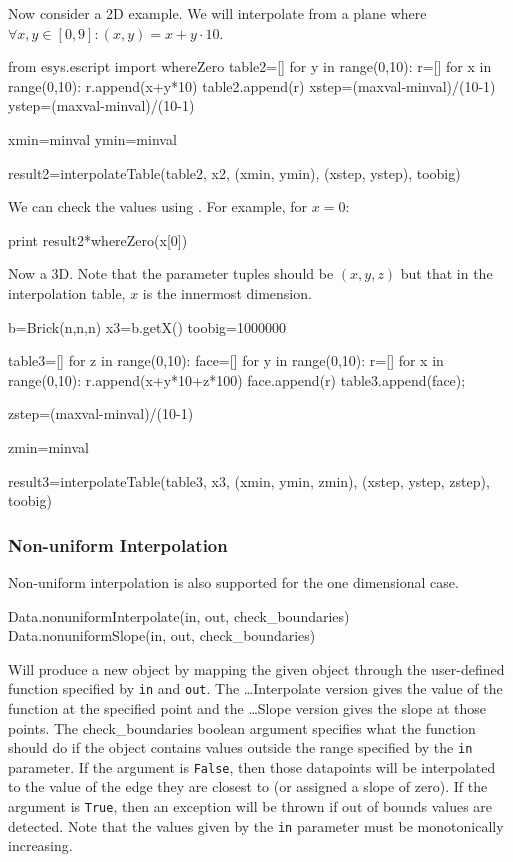 Now consider a 2D example. We will interpolate from a plane where $\forall x,y\in[0,9]:(x,y)=x+y\cdot10$.

\begin{python}
from esys.escript import whereZero
table2=[]
for y in range(0,10):
      r=[]
      for x in range(0,10):
	 r.append(x+y*10)
      table2.append(r)
xstep=(maxval-minval)/(10-1)
ystep=(maxval-minval)/(10-1)

xmin=minval
ymin=minval

result2=interpolateTable(table2, x2, (xmin, ymin), (xstep, ystep), toobig)
\end{python}

We can check the values using .
For example, for $x=0$:
\begin{python}
print result2*whereZero(x[0]) 
\end{python}

Now a 3D. Note that the parameter tuples should be $(x,y,z)$ but that in the interpolation table, $x$ is the innermost dimension.
\begin{python}
b=Brick(n,n,n)
x3=b.getX()
toobig=1000000

table3=[]
for z in range(0,10):
   face=[]
   for y in range(0,10):
      r=[]
      for x in range(0,10):
	 r.append(x+y*10+z*100)
      face.append(r)
   table3.append(face);

zstep=(maxval-minval)/(10-1)

zmin=minval

result3=interpolateTable(table3, x3, (xmin, ymin, zmin), (xstep, ystep, zstep), toobig)
\end{python}


\subsubsection{Non-uniform Interpolation}
Non-uniform interpolation is also supported for the one dimensional case.
\begin{python}
Data.nonuniformInterpolate(in, out, check_boundaries)
Data.nonuniformSlope(in, out, check_boundaries)
\end{python}

Will produce a new \Data object by mapping the given \Data object through the user-defined function
specified by \texttt{in} and \texttt{out}.
The \ldots Interpolate version gives the value of the function at the specified point and the 
\ldots Slope version gives the slope at those points.
The check_boundaries boolean argument specifies what the function should do if the \Data object contains
values outside the range specified by the \texttt{in} parameter.
If the argument is \texttt{False}, then those datapoints will be interpolated to the value of the edge 
they are closest to (or assigned a slope of zero).
If the argument is \texttt{True}, then an exception will be thrown if out of bounds values are detected.
Note that the values given by the \texttt{in} parameter must be monotonically increasing.


